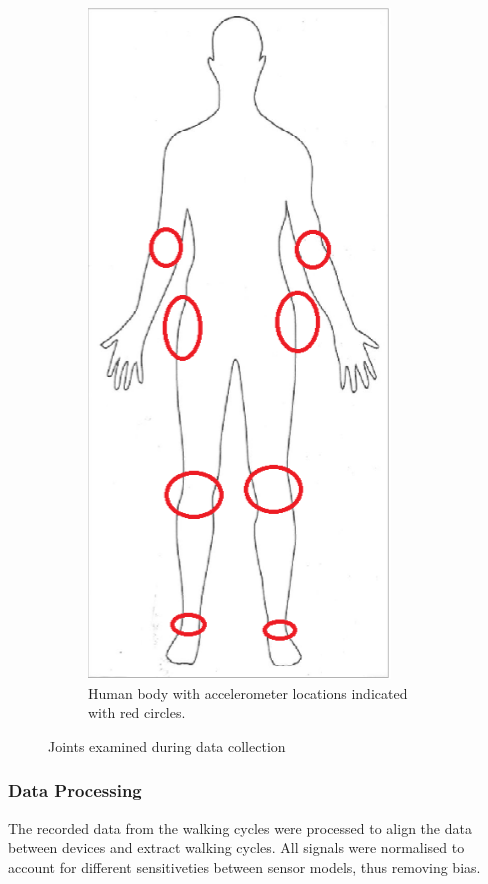 \begin{figure}[H]
\begin{subfigure}[b]{0.5\textwidth}
        \includegraphics[scale=0.50]{include/figure/Human_Joints.PNG}
        \caption{Human body with accelerometer locations indicated with red circles.}
        \label{fig:Human_Joints}
    \end{subfigure}
    \caption{Joints examined during data collection}
    \label{fig:RLH1}
\end{figure}
\subsubsection{Data Processing}
The recorded data from the walking cycles were processed to align the data between devices and extract walking cycles. All signals were normalised to account for different sensitiveties between sensor models, thus removing bias.




